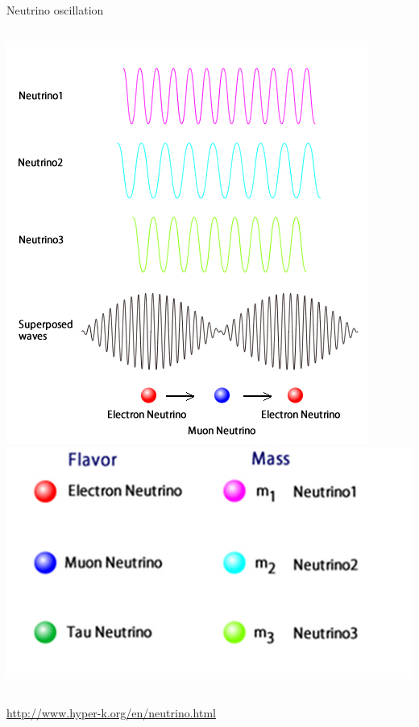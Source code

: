 \documentclass[]{beamer}
\begin{document}
\begin{frame}{Neutrino oscillation}
	\begin{columns}[c]
		\centering
		\includegraphics[width=\textwidth]{defence/waves}
		\centering
		\includegraphics[width=\textwidth]{defence/neutrino-flavor_scaled}
	\end{columns}
	\centering
	{\tiny\url{http://www.hyper-k.org/en/neutrino.html}}
\end{frame}
\end{document}
